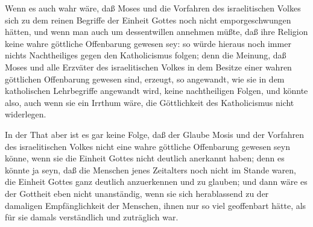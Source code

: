\begin{aufza}
\item Wenn es auch wahr wäre, daß Moses und die Vorfahren des israelitischen Volkes sich zu dem reinen Begriffe der Einheit Gottes noch nicht emporgeschwungen hätten, und wenn man auch um dessentwillen annehmen müßte, daß ihre Religion keine wahre göttliche Offenbarung gewesen sey: so würde hieraus noch immer nichts Nachtheiliges gegen den Katholicismus folgen; denn die Meinung, daß Moses und alle Erzväter des israelitischen Volkes in dem Besitze einer wahren göttlichen Offenbarung gewesen sind, erzeugt, so angewandt, wie sie in dem katholischen Lehrbegriffe angewandt wird, keine nachtheiligen Folgen, und könnte also, auch wenn sie ein Irrthum wäre, die Göttlichkeit des Katholicismus nicht widerlegen.~
\item In der That aber ist es gar keine Folge, daß der Glaube Mosis und der Vorfahren des israelitischen Volkes nicht eine wahre göttliche Offenbarung gewesen seyn könne, wenn sie die Einheit Gottes nicht deutlich anerkannt haben; denn es könnte ja seyn, daß die Menschen jenes Zeitalters noch nicht im Stande waren, die Einheit Gottes ganz deutlich anzuerkennen und zu glauben; und dann wäre es der Gottheit eben nicht unanständig, wenn sie sich herablassend zu der damaligen Empfänglichkeit der Menschen, ihnen nur so viel geoffenbart hätte, als für sie damals verständlich und zuträglich war.

\end{aufza}
